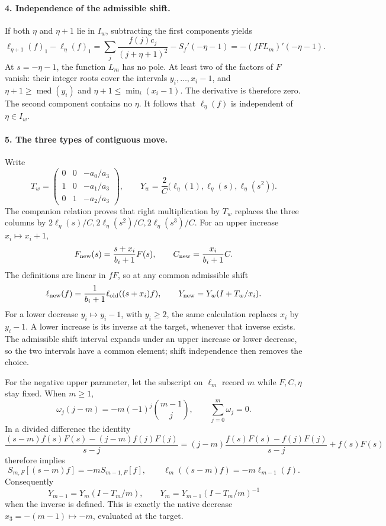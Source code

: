 \documentclass[11pt]{article}
\begin{document}
\paragraph{4. Independence of the admissible shift.}
If both $\eta$ and $\eta+1$ lie in $I_w$, subtracting the first
components yields
\[
 \ell_{\eta+1}(f)_1-\ell_\eta(f)_1
 =\sum_j\frac{f(j)c_j}{(j+\eta+1)^2}
   -S_f'(-\eta-1)
 =-(fF L_m)'(-\eta-1).
\]
At $s=-\eta-1$, the function $L_m$ has no pole.  At least two of the
factors of $F$ vanish: their integer roots cover the intervals
$y_i,\ldots,x_i-1$, and
$\eta+1\ge\operatorname{med}(y_i)$ and
$\eta+1\le\min_i(x_i-1)$.  The derivative is therefore zero.
The second component contains no $\eta$.  It follows that
$\ell_\eta(f)$ is independent of $\eta\in I_w$.

\paragraph{5. The three types of contiguous move.}
Write
\[
 T_w=\begin{pmatrix}0&0&-a_0/a_3\\1&0&-a_1/a_3\\0&1&-a_2/a_3\end{pmatrix},
 \qquad
 Y_w=\frac2C\bigl(\ell_\eta(1),\ell_\eta(s),\ell_\eta(s^2)\bigr).
\]
The companion relation proves that right multiplication by $T_w$
replaces the three columns by
$2\ell_\eta(s)/C,2\ell_\eta(s^2)/C,2\ell_\eta(s^3)/C$.
For an upper increase $x_i\mapsto x_i+1$,
\[
 F_{\rm new}(s)=\frac{s+x_i}{b_i+1}F(s),\qquad
 C_{\rm new}=\frac{x_i}{b_i+1}C.
\]
The definitions are linear in $fF$, so at any common admissible shift
\[
 \ell_{\rm new}(f)=\frac1{b_i+1}\ell_{\rm old}((s+x_i)f),
 \qquad Y_{\rm new}=Y_w(I+T_w/x_i).
\]
For a lower decrease $y_i\mapsto y_i-1$, with $y_i\ge2$, the same
calculation replaces $x_i$ by $y_i-1$.  A lower increase is its inverse
at the target, whenever that inverse exists.  The admissible shift
interval expands under an upper increase or lower decrease, so the two
intervals have a common element; shift independence then removes the
choice.

For the negative upper parameter, let the subscript on $\ell_m$ record
$m$ while $F,C,\eta$ stay fixed.  When $m\ge1$,
\[
 \omega_j(j-m)=-m(-1)^j\binom{m-1}{j},\qquad
 \sum_{j=0}^m\omega_j=0.
\]
In a divided difference the identity
\[
 \frac{(s-m)f(s)F(s)-(j-m)f(j)F(j)}{s-j}
 =(j-m)\frac{f(s)F(s)-f(j)F(j)}{s-j}+f(s)F(s)
\]
therefore implies
\[
 S_{m,F}[(s-m)f]=-mS_{m-1,F}[f],\qquad
 \ell_m((s-m)f)=-m\ell_{m-1}(f).
\]
Consequently
\[
 Y_{m-1}=Y_m(I-T_m/m),\qquad
 Y_m=Y_{m-1}(I-T_m/m)^{-1}
\]
when the inverse is defined.  This is exactly the native decrease
$x_3=-(m-1)\mapsto-m$, evaluated at the target.
\end{document}
